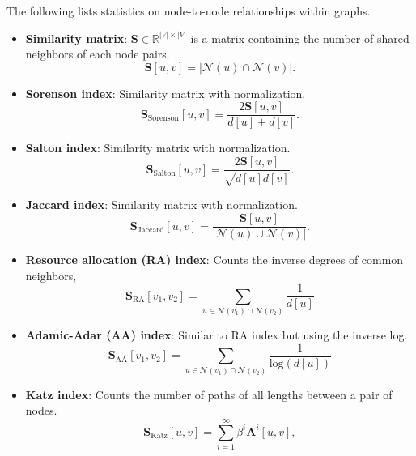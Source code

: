 \documentclass[twocolumn]{article}
\theoremstyle{plain}
\begin{document}
The following lists statistics on node-to-node relationships within graphs.
\begin{itemize}
    \item \textbf{Similarity matrix}: $\mathbf{S} \in \mathbb{R}^{|V|\times |V|}$ is a matrix containing the number of shared neighbors of each node pairs.
        \begin{equation}
            \mathbf{S}[u,v] = |\mathcal{N}(u)\cap\mathcal{N}(v)|.
        \end{equation}
    \item \textbf{Sorenson index}: Similarity matrix with normalization.
        \begin{equation}
            \mathbf{S}_{\text{Sorenson}}[u,v] = \frac{2\mathbf{S}[u,v]}{d[u] + d[v]}.
        \end{equation}
    \item \textbf{Salton index}: Similarity matrix with normalization.
        \begin{equation}
            \mathbf{S}_{\text{Salton}}[u,v] = \frac{2\mathbf{S}[u,v]}{\sqrt{d[u]d[v]}}.
        \end{equation}
    \item \textbf{Jaccard index}: Similarity matrix with normalization.
        \begin{equation}
            \mathbf{S}_{\text{Jaccard}}[u,v] = \frac{\mathbf{S}[u,v]}{|\mathcal{N}(u) \cup \mathcal{N}(v)|}.
        \end{equation}
    \item \textbf{Resource allocation (RA) index}: Counts the inverse degrees of common neighbors,
        \begin{equation}
            \mathbf{S}_{\text{RA}}[v_1, v_2] = \sum_{u \in \mathcal{N}(v_1) \cap \mathcal{N}(v_2)}{\frac{1}{d[u]}}
        \end{equation}
    \item \textbf{Adamic-Adar (AA) index}: Similar to RA index but using the inverse log.
        \begin{equation}
            \mathbf{S}_{\text{AA}}[v_1, v_2] = \sum_{u \in \mathcal{N}(v_1) \cap \mathcal{N}(v_2)}{\frac{1}{\text{log}(d[u])}}
        \end{equation}
    \item \textbf{Katz index}: Counts the number of paths of all lengths between a pair of nodes.
        \begin{equation}
            \mathbf{S}_{\text{Katz}}[u,v] = \sum_{i=1}^{\infty}{\beta^i\mathbf{A}^i[u,v]},
        \end{equation}

\end{itemize}
\end{document}
